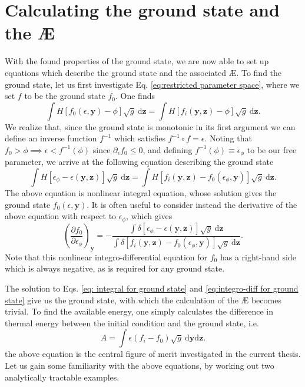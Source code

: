 \section{Calculating the ground state and the \AE{}}
With the found properties of the ground state, we are now able to set up equations which describe the ground state and the associated \AE{}. To find the ground state, let us first investigate Eq. \eqref{eq:restricted parameter space}, where we set $f$ to be the ground state $f_0$. One finds
\begin{equation}
    \int H[f_0(\epsilon,\boldsymbol{y}) - \phi] \sqrt{g} \: \mathrm{d} \boldsymbol{z} = \int H[f_i(\boldsymbol{y},\boldsymbol{z}) - \phi] \sqrt{g} \: \mathrm{d} \boldsymbol{z}.
\end{equation}
We realize that, since the ground state is monotonic in its first argument we can define an inverse function $f^{-1}$ which satisfies $f^{-1} \circ f =\epsilon$. Noting that $f_0 > \phi \implies \epsilon < f^{-1}(\phi)$ since $\partial_\epsilon f_0 \leq 0$, and defining $f^{-1}(\phi)\equiv \epsilon_\phi$ to be our free parameter, we arrive at the following equation describing the ground state
\begin{equation}
    \int H[\epsilon_\phi - \epsilon(\boldsymbol{y},\boldsymbol{z})] \sqrt{g} \: \mathrm{d} \boldsymbol{z} = \int H[f_i(\boldsymbol{y},\boldsymbol{z}) - f_0(\epsilon_\phi,\boldsymbol{y})] \sqrt{g} \: \mathrm{d} \boldsymbol{z}.
    \label{eq: integral for ground state}
\end{equation}
The above equation is nonlinear integral equation, whose solution gives the ground state $f_0(\epsilon,\boldsymbol{y})$. It is often useful to consider instead the derivative of the above equation with respect to $\epsilon_\phi$, which gives
\begin{equation}
    \left( \frac{\partial f_0}{\partial \epsilon_\phi} \right)_{\boldsymbol{y}} = - \frac{\int \delta[\epsilon_\phi - \epsilon(\boldsymbol{y},\boldsymbol{z})] \sqrt{g} \: \mathrm{d} \boldsymbol{z}}{\int \delta[f_i(\boldsymbol{y},\boldsymbol{z}) - f_0(\epsilon_\phi,\boldsymbol{y})] \sqrt{g} \: \mathrm{d} \boldsymbol{z}}.
    \label{eq:integro-diff for ground state}
\end{equation}
Note that this nonlinear integro-differential equation for $f_0$ has a right-hand side which is always negative, as is required for any ground state. \par 
The solution to Eqs. \eqref{eq: integral for ground state} and \eqref{eq:integro-diff for ground state} give us the ground state, with which the calculation of the \AE{} becomes trivial. To find the available energy, one simply calculates the difference in thermal energy between the initial condition and the ground state, i.e. 
\begin{equation}
    A = \int \epsilon \left( f_i - f_0 \right) \sqrt{g} \: \mathrm{d}\boldsymbol{y} \mathrm{d}\boldsymbol{z}.
    \label{eq: available energy central equation}
\end{equation}
the above equation is the central figure of merit investigated in the current thesis. Let us gain some familiarity with the above equations, by working out two analytically tractable examples.

